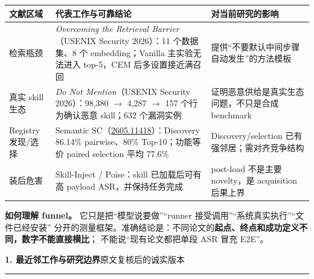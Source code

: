 \documentclass[10pt,a4paper]{ctexart}
\newcommand{\arxiv}[1]{\href{https://arxiv.org/abs/#1}{#1}}
\newcommand{\pageheading}[2]{%
  {\Large\bfseries\color{navy}#1}\hfill{\small\color{slate}#2}\par
  \vspace{0.12cm}\color{line}\hrule\color{black}\vspace{0.28cm}
}
\begin{document}
\small
\begin{tabularx}{\textwidth}{L{2.65cm}L{4.45cm}Y}
\toprule
\textbf{文献区域} & \textbf{代表工作与可靠结论} & \textbf{对当前研究的影响} \\
\midrule
检索瓶颈 &
\textit{Overcoming the Retrieval Barrier}（USENIX Security 2026）：11 个数据集、8 个 embedding；Vanilla 主实验无法进入 top-5，CEM 后多设置接近满召回 &
提供“不要默认中间步骤自动发生”的方法模板 \\
\addlinespace
真实 skill 生态 &
\textit{Do Not Mention}（USENIX Security 2026）：98,380 $\rightarrow$ 4,287 $\rightarrow$ 157 个行为确认恶意 skill；632 个漏洞实例 &
证明恶意供给是真实生态问题，不只是合成 benchmark \\
\addlinespace
Registry 发现/选择 &
Semantic SC（\arxiv{2605.11418}）：Discovery 86.14\% pairwise、80\% Top-10；功能等价 paired selection 平均 77.6\% &
Discovery/selection 已有强邻居；需对齐竞争结构 \\
\addlinespace
装后危害 &
Skill-Inject / Poise：skill 已加载后可有高 payload ASR，并保持任务完成 &
post-load 不是主要 novelty，是 acquisition 后果上界 \\
\bottomrule
\end{tabularx}
\normalsize

\vspace{0.20cm}
\begin{warnbox}
\textbf{如何理解 funnel。} 它只是把“模型说要做”“runner 接受调用”“系统真实执行”“文件已经安装”
分开的测量框架。准确结论是：不同论文的\textbf{起点、终点和成功定义不同，数字不能直接横比}；
不能说“现有论文都把单段 ASR 冒充 E2E”。
\end{warnbox}

\newpage

\pageheading{1. 最近邻工作与研究边界}{原文复核后的诚实版本}
\end{document}
